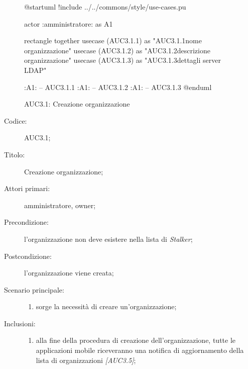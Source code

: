 \documentclass[../../../analisi-dei-requisiti.tex]{subfiles}
\begin{document}
\begin{figure}[H]
  \centering
  \begin{plantuml}
    @startuml
    !include ../../commons/style/use-cases.pu

    actor :amministratore: as A1

    rectangle {
        together {
            usecase (AUC3.1.1) as "AUC3.1.1\nInserisci nome organizzazione"
            usecase (AUC3.1.2) as "AUC3.1.2\nInserisci descrizione organizzazione"
            usecase (AUC3.1.3) as "AUC3.1.3\nConfigurazione dettagli server LDAP"
          }
      }

    :A1: -- AUC3.1.1
    :A1: -- AUC3.1.2
    :A1: -- AUC3.1.3
    @enduml
  \end{plantuml}
  \caption{AUC3.1: Creazione organizzazione}%
  \label{fig:AUC3_1}
\end{figure}

\begin{description}
  \item[Codice:] AUC3.1;
  \item[Titolo:] Creazione organizzazione;
  \item[Attori primari:] amministratore, owner;
  \item[Precondizione:] l'organizzazione non deve esistere nella lista di \emph{Stalker};
  \item[Postcondizione:] l'organizzazione viene creata;
  \item[Scenario principale:]
        \begin{enumerate}
          \item sorge la necessità di creare un'organizzazione;
        \end{enumerate}
  \item[Inclusioni:]
        \begin{enumerate}
          \item alla fine della procedura di creazione dell'organizzazione, tutte le applicazioni mobile riceveranno una notifica di aggiornamento
                della lista di organizzazioni \emph{[AUC3.5]};
        \end{enumerate}
\end{description}
\end{document}
